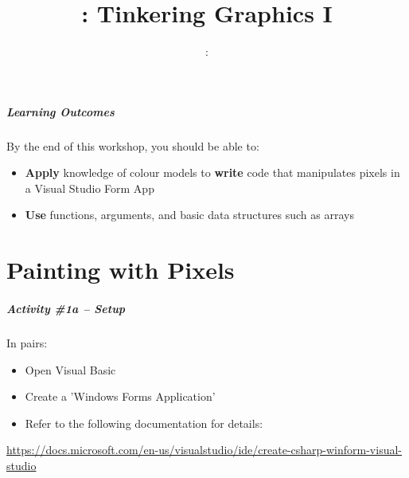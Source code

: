 \usepackage{../../beamerthemeFalmouthGamesAcademy}
\usepackage{multimedia}
\graphicspath{ {../../} }


\usepackage[normalem]{ulem}
\usepackage{wasysym}

\usepackage{pdfpages}

\usetikzlibrary{arrows,automata}







\title{\sessionnumber: Tinkering Graphics I}
\subtitle{\modulecode: \moduletitle}

\frame{\titlepage} 

\begin{frame}
	\frametitle{Learning Outcomes}
	By the end of this workshop, you should be able to:	
	\begin{itemize}
		\item \textbf{Apply} knowledge of colour models to \textbf{write} code that manipulates pixels in a Visual Studio Form App
		\item \textbf{Use} functions, arguments, and basic data structures such as arrays
	\end{itemize}
\end{frame}

\part{Painting with Pixels}
\frame{\partpage}

\begin{frame}
	\frametitle{Activity \#1a -- Setup}
	
	In pairs:
	
	\vspace{2em}
	
	\begin{itemize}		
		\item Open Visual Basic 
		\item Create a 'Windows Forms Application'
		\item Refer to the following documentation for details:
	\end{itemize}
\scriptsize \url{https://docs.microsoft.com/en-us/visualstudio/ide/create-csharp-winform-visual-studio}
\end{frame}

